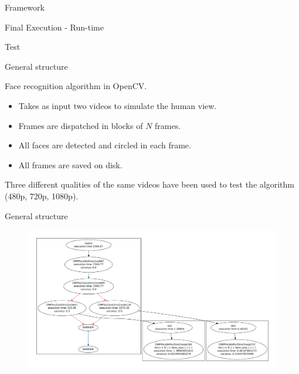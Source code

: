 \documentclass[xcolor=dvipsnames]{beamer}
\begin{document}
\begin{section}{Framework}
\begin{frame}{\hskip 0.3cm Final Execution - Run-time}
\end{frame}











\end{section}
\begin{section}{Test}











\begin{frame}{\hskip 0.3cm General structure}

Face recognition algorithm in OpenCV.

\begin{itemize}

\item Takes as input two videos to simulate the human view.

\item Frames are dispatched in blocks of $N$ frames.
 
\item All faces are detected and circled in each frame.

\item All frames are saved on disk.


\end{itemize}

Three different qualities of the same videos have been used to test the algorithm (480p, 720p, 1080p).


\end{frame}
















\begin{frame}{\hskip 0.3cm General structure}

\vskip -1cm

\begin{figure}
\hskip -1cm

\includegraphics[scale=0.23]{test.pdf}
\end{figure}


\end{frame}
\end{section}
\end{document}

